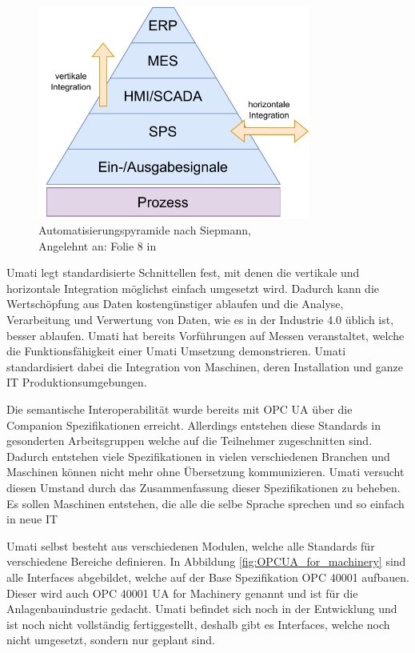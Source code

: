 \documentclass[a4paper, 12pt, oneside, toc=listofnumbered, bibliography=totoc]{scrbook}
\begin{document}
		\begin{figure}[H]
			\centering
			\includegraphics[width=0.8\textwidth]{res/diagramms/Automatisierungspyramide.pdf}
			\caption{Automatisierungspyramide nach Siepmann, \\ Angelehnt an: Folie 8 in \cite{mielebacher_verteilte_2021}} 
			\label{fig:Automatisierungspyramide}
		\end{figure}
		
		\ac{Umati} legt standardisierte Schnittellen fest, mit denen die vertikale und horizontale Integration möglichst einfach umgesetzt wird. Dadurch kann die Wertschöpfung aus Daten kostengünstiger ablaufen und die Analyse, Verarbeitung und Verwertung von Daten, wie es in der Industrie 4.0 üblich ist, besser ablaufen. \ac{Umati} hat bereits Vorführungen auf Messen veranstaltet, welche die Funktionsfähigkeit einer \ac{Umati} Umsetzung demonstrieren. \ac{Umati} standardisiert dabei die Integration von Maschinen, deren Installation und ganze IT Produktionsumgebungen. \cite{noauthor_about_nodate}
		
		Die semantische Interoperabilität wurde bereits mit OPC UA über die Companion Spezifikationen erreicht. Allerdings entstehen diese Standards in gesonderten Arbeitsgruppen welche auf die Teilnehmer zugeschnitten sind. Dadurch entstehen viele Spezifikationen in vielen verschiedenen Branchen und Maschinen können nicht mehr ohne Übersetzung kommunizieren. \ac{Umati} versucht diesen Umstand durch das Zusammenfassung dieser Spezifikationen zu beheben. Es sollen Maschinen entstehen, die alle die selbe Sprache sprechen und so einfach in neue IT 
		
		\ac{Umati} selbst besteht aus verschiedenen Modulen, welche alle Standards für verschiedene Bereiche definieren. In Abbildung \ref{fig:OPCUA_for_machinery} sind alle Interfaces abgebildet, welche auf der Base Spezifikation OPC 40001 aufbauen. Dieser wird auch OPC 40001 UA for Machinery genannt und ist für die Anlagenbauindustrie gedacht. \ac{Umati} befindet sich noch in der Entwicklung und ist noch nicht vollständig fertiggestellt, deshalb gibt es Interfaces, welche noch nicht umgesetzt, sondern nur geplant sind. \cite{noauthor_machinery_nodate}
		
\end{document}
